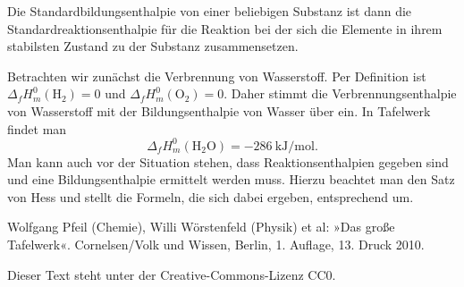 \documentclass[a4paper,11pt,fleqn,twocolumn]{article}
\newcommand{\unit}[1]{\mathrm{#1}}
\begin{document}
Die Standardbildungsenthalpie von einer beliebigen Substanz
ist dann die Standardreaktionsenthalpie für die Reaktion bei der
sich die Elemente in ihrem stabilsten Zustand
zu der Substanz zusammensetzen.

Betrachten wir zunächst die Verbrennung von Wasserstoff.
Per Definition ist $\Delta_f H_m^0(\mathrm{H_2})=0$
und $\Delta_f H_m^0(\mathrm{O_2})=0$. Daher stimmt die
Verbrennungsenthalpie von Wasserstoff mit der Bildungsenthalpie
von Wasser über ein. In Tafelwerk \cite{Cornelsen} findet man
\[\Delta_f H_m^0 (\mathrm{H_2O}) = -286\:\unit{kJ/mol}.\]
Man kann auch vor der Situation stehen, dass Reaktionsenthalpien
gegeben sind und eine Bildungsenthalpie ermittelt werden muss.
Hierzu beachtet man den Satz von Hess und stellt die Formeln,
die sich dabei ergeben, entsprechend um.

\begin{thebibliography}{xx}
\setlength{\itemsep}{0pt}
 Wolfgang Pfeil (Chemie), Willi Wörstenfeld (Physik)
et al:
»Das große Tafelwerk«.
Cornelsen/Volk und Wissen, Berlin, 1. Auflage, 13. Druck 2010.
\end{thebibliography}

\vfill

\noindent
{\small Dieser Text steht unter der Creative-Commons-Lizenz CC0.}
\end{document}
